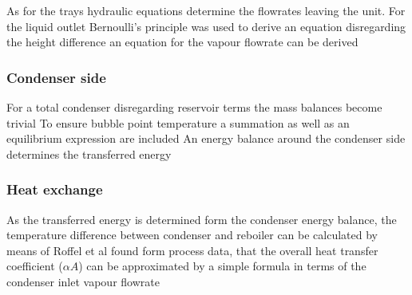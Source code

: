         As for the trays hydraulic equations determine the flowrates leaving the unit. For the liquid 
        outlet Bernoulli's principle was used to derive an equation
        disregarding the height difference an equation for the vapour flowrate can be derived
        
    \subsubsection{Condenser side}
        For a total condenser disregarding reservoir terms the mass balances become trivial 
        To ensure bubble point temperature a summation as well as an equilibrium expression are included
        An energy balance around the condenser side determines the transferred energy
        
    \subsubsection{Heat exchange}
        As the transferred energy is determined form the condenser energy balance, the temperature
        difference between condenser and reboiler can be calculated by means of 
        Roffel et al \cite{Roffel.2000} found form process data, that the overall heat transfer coefficient ($\alpha A$)
        can be approximated by a simple formula in terms of the condenser inlet vapour flowrate
        


